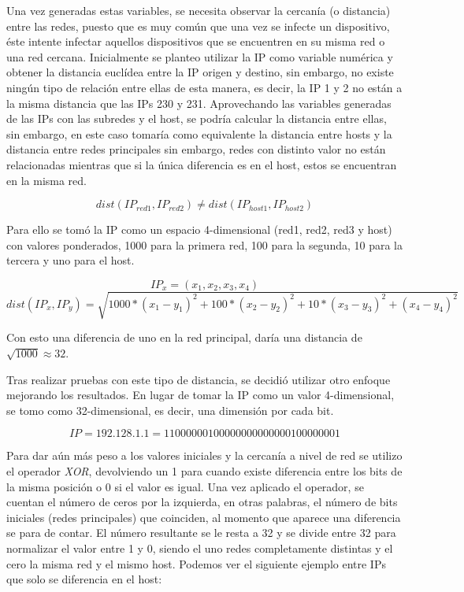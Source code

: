 Una vez generadas estas variables, se necesita observar la cercanía (o distancia) entre las redes, puesto que es muy común que una vez se infecte un dispositivo, éste intente infectar aquellos dispositivos que se encuentren en su misma red o una red cercana. Inicialmente se planteo utilizar la IP como variable numérica y obtener la distancia euclídea entre la IP origen y destino, sin embargo, no existe ningún tipo de relación entre ellas de esta manera, es decir, la IP 1 y 2 no están a la misma distancia que las IPs 230 y 231. Aprovechando las variables generadas de las IPs con las subredes y el host, se podría calcular la distancia entre ellas, sin embargo, en este caso tomaría como equivalente la distancia entre hosts y la distancia entre redes principales sin embargo, redes con distinto valor no están relacionadas mientras que si la única diferencia es en el host, estos se encuentran en la misma red.

\begin{equation}
    dist(IP_{red1}, IP_{red2}) \neq  dist(IP_{host1}, IP_{host2})
\end{equation}

Para ello se tomó la IP como un espacio 4-dimensional (red1, red2, red3 y host) con valores ponderados, 1000 para la primera red, 100 para la segunda, 10 para la tercera y uno para el host.

\begin{equation}
    IP_x = (x_1, x_2, x_3, x_4)
\end{equation}
\begin{equation}
    dist(IP_x, IP_y) = \sqrt{1000*(x_1 - y_1)^2 + 100*(x_2 - y_2)^2 + 10*(x_3 - y_3)^2 + (x_4 - y_4)^2}
\end{equation}

Con esto una diferencia de uno en la red principal, daría una distancia de \(\sqrt{1000} \approx 32\).

Tras realizar pruebas con este tipo de distancia, se decidió utilizar otro enfoque mejorando los resultados. En lugar de tomar la IP como un valor 4-dimensional, se tomo como 32-dimensional, es decir, una dimensión por cada bit.

\begin{equation}
    IP = 192.128.1.1 = 11000000100000000000000100000001
\end{equation}

Para dar aún más peso a los valores iniciales y la cercanía a nivel de red se utilizo el operador \textit{XOR}, devolviendo un 1 para cuando existe diferencia entre los bits de la misma posición o 0 si el valor es igual. Una vez aplicado el operador, se cuentan el número de ceros por la izquierda, en otras palabras, el número de bits iniciales (redes principales) que coinciden, al momento que aparece una diferencia se para de contar. El número resultante se le resta a 32 y se divide entre 32 para normalizar el valor entre 1 y 0, siendo el uno redes completamente distintas y el cero la misma red y el mismo host. Podemos ver el siguiente ejemplo entre IPs que solo se diferencia en el host:


